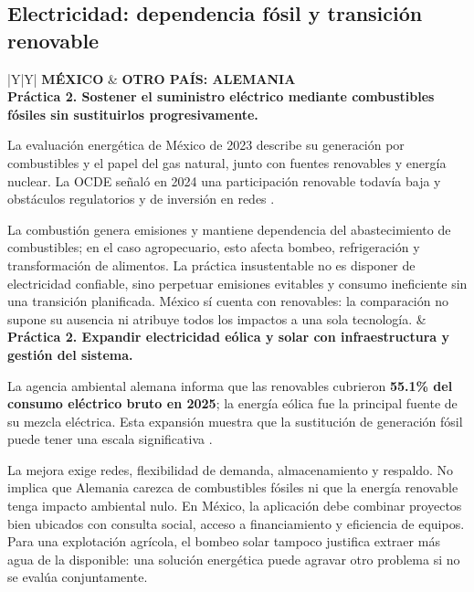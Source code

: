 \begin{landscape}
\subsection{Electricidad: dependencia fósil y transición renovable}
\begin{tabularx}{\linewidth}{|Y|Y|}
\hline
{}\textbf{MÉXICO} & \textbf{OTRO PAÍS: ALEMANIA}\\
\hline
\textbf{Práctica 2. Sostener el suministro eléctrico mediante combustibles fósiles sin sustituirlos progresivamente.}
\par La evaluación energética de México de 2023 describe su generación por combustibles y el papel del gas natural, junto con fuentes renovables y energía nuclear. La OCDE señaló en 2024 una participación renovable todavía baja y obstáculos regulatorios y de inversión en redes \parencite{eiaMexico2023,ocdeMexico2024}.
\par La combustión genera emisiones y mantiene dependencia del abastecimiento de combustibles; en el caso agropecuario, esto afecta bombeo, refrigeración y transformación de alimentos. La práctica insustentable no es disponer de electricidad confiable, sino perpetuar emisiones evitables y consumo ineficiente sin una transición planificada. México sí cuenta con renovables: la comparación no supone su ausencia ni atribuye todos los impactos a una sola tecnología.
&
\textbf{Práctica 2. Expandir electricidad eólica y solar con infraestructura y gestión del sistema.}
\par La agencia ambiental alemana informa que las renovables cubrieron \textbf{55.1\% del consumo eléctrico bruto en 2025}; la energía eólica fue la principal fuente de su mezcla eléctrica. Esta expansión muestra que la sustitución de generación fósil puede tener una escala significativa \parencite{uba2026}.
\par La mejora exige redes, flexibilidad de demanda, almacenamiento y respaldo. No implica que Alemania carezca de combustibles fósiles ni que la energía renovable tenga impacto ambiental nulo. En México, la aplicación debe combinar proyectos bien ubicados con consulta social, acceso a financiamiento y eficiencia de equipos. Para una explotación agrícola, el bombeo solar tampoco justifica extraer más agua de la disponible: una solución energética puede agravar otro problema si no se evalúa conjuntamente.
\\\hline
{}\\
\hline
\end{tabularx}


\end{landscape}
